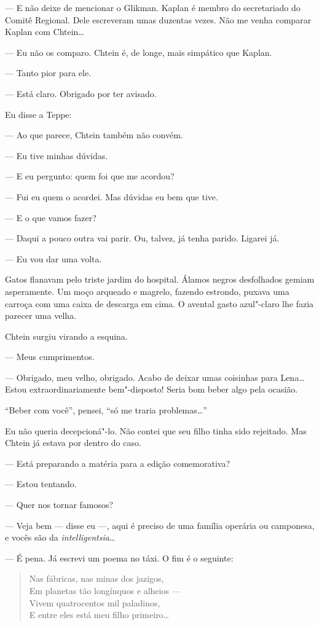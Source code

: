 --- E não deixe de mencionar o Glikman. Kaplan é membro do secretariado
do Comitê Regional. Dele escreveram umas duzentas vezes. Não me venha
comparar Kaplan com Chtein\ldots{}

--- Eu não os comparo. Chtein é, de longe, mais simpático que Kaplan.

--- Tanto pior para ele.

--- Está claro. Obrigado por ter avisado.

Eu disse a Teppe:

--- Ao que parece, Chtein também não convém.

--- Eu tive minhas dúvidas.

--- E eu pergunto: quem foi que me acordou?

--- Fui eu quem o acordei. Mas dúvidas eu bem que tive.

--- E o que vamos fazer?

--- Daqui a pouco outra vai parir. Ou, talvez, já tenha parido. Ligarei
já.

--- Eu vou dar uma volta.

Gatos flanavam pelo triste jardim do hospital. Álamos negros desfolhados
gemiam asperamente. Um moço arqueado e magrelo, fazendo estrondo, puxava
uma carroça com uma caixa de descarga em cima. O avental gasto
azul"-claro lhe fazia parecer uma velha.

Chtein surgiu virando a esquina.

--- Meus cumprimentos.

--- Obrigado, meu velho, obrigado. Acabo de deixar umas coisinhas para
Lena\ldots{} Estou extraordinariamente bem"-disposto! Seria bom beber algo
pela ocasião.

``Beber com você'', pensei, ``só me traria problemas\ldots{}''

Eu não queria decepcioná"-lo. Não contei que seu filho tinha sido
rejeitado. Mas Chtein já estava por dentro do caso.

--- Está preparando a matéria para a edição comemorativa?

--- Estou tentando.

--- Quer nos tornar famosos?

--- Veja bem --- disse eu ---, aqui é preciso de uma família operária ou
camponesa, e vocês são da \emph{intelligentsia}\ldots{}

--- É pena. Já escrevi um poema no táxi. O fim é o seguinte:

\begin{verse}
Nas fábricas, nas minas dos jazigos,\\
Em planetas tão longínquos e alheios ---\\
Vivem quatrocentos mil paladinos,\\
E entre eles está meu filho primeiro\ldots{}
\end{verse}

